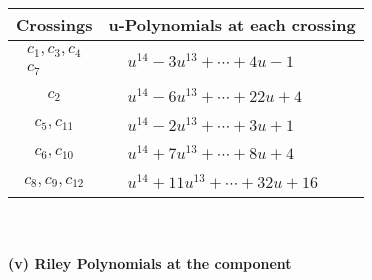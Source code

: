 \documentclass[1p]{elsarticle_modified}
\theoremstyle{definition}
\begin{document}
\begin{tabular}{m{50pt}|m{274pt}}
Crossings & \hspace{64pt}u-Polynomials at each crossing \\
\hline $$\begin{aligned}c_{1},c_{3},c_{4}\\c_{7}\end{aligned}$$&$\begin{aligned}
&u^{14}-3 u^{13}+\cdots+4 u-1
\end{aligned}$\\
\hline $$\begin{aligned}c_{2}\end{aligned}$$&$\begin{aligned}
&u^{14}-6 u^{13}+\cdots+22 u+4
\end{aligned}$\\
\hline $$\begin{aligned}c_{5},c_{11}\end{aligned}$$&$\begin{aligned}
&u^{14}-2 u^{13}+\cdots+3 u+1
\end{aligned}$\\
\hline $$\begin{aligned}c_{6},c_{10}\end{aligned}$$&$\begin{aligned}
&u^{14}+7 u^{13}+\cdots+8 u+4
\end{aligned}$\\
\hline $$\begin{aligned}c_{8},c_{9},c_{12}\end{aligned}$$&$\begin{aligned}
&u^{14}+11 u^{13}+\cdots+32 u+16
\end{aligned}$\\
\hline
\end{tabular}\\~\\
\newpage\renewcommand{\arraystretch}{1}
\flushleft \textbf{(v) Riley Polynomials at the component}\newline \\
\end{document}
